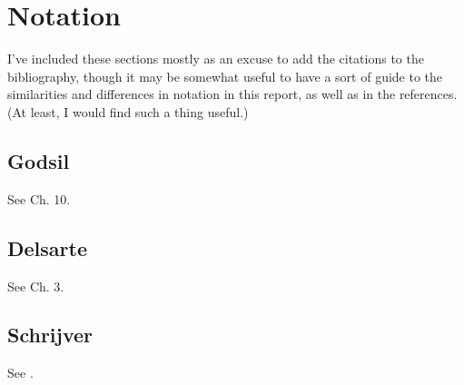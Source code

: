\documentclass{report}
\begin{document}
\chapter{Notation}
  I've included these sections mostly as an excuse to add the citations to the
  bibliography, though it may be somewhat useful to have a sort of guide to the
  similarities and differences in notation in this report, as well as in the
  references.  (At least, I would find such a thing useful.)

  \section{Godsil}
    See \cite{godsil} Ch. 10.

  \section{Delsarte}
    See \cite{delsarte} Ch. 3.

  \section{Schrijver}
    See \cite{schrijver}.

\printbibliography[heading=bibintoc]
\end{document}
